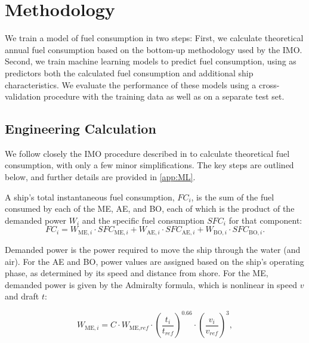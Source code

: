 \section{Methodology}\label{sec:MLmethodology}

We train a model of fuel consumption in two steps: First, we calculate theoretical annual fuel consumption based on the bottom-up methodology used by the \ac{IMO}. Second, we train machine learning models to predict fuel consumption, using as predictors both the calculated fuel consumption and additional ship characteristics. We evaluate the performance of these models using a cross-validation procedure with the training data as well as on a separate test set.

\subsection{Engineering Calculation}\label{subsec:engcalc}
We follow closely the \ac{IMO} procedure described in \textcite{faber2020fourth} to calculate theoretical fuel consumption, with only a few minor simplifications. The key steps are outlined below, and further details are provided in \autoref{app:ML}. 

A ship's total instantaneous fuel consumption, $FC_{i}$, is the sum of the fuel consumed by each of the \acf{ME}, \acf{AE}, and \acf{BO}, each of which is the product of the demanded power $W_{i}$ and the specific fuel consumption $SFC_{i}$ for that component:
\begin{equation*}
    FC_{i} = W_{\text{ME},i} \cdot SFC_{\text{ME},i} + W_{\text{AE},i} \cdot SFC_{\text{AE},i} + W_{\text{BO},i} \cdot SFC_{\text{BO},i}.
\end{equation*}

Demanded power is the power required to move the ship through the water (and air). For the \acl{AE} and \acl{BO}, power values are assigned based on the ship's operating phase, as determined by its speed and distance from shore. For the \acl{ME}, demanded power is given by the Admiralty formula, which is nonlinear in speed $v$ and draft $t$:

\begin{equation}\label{eqn:admiralty}
    W_{\text{ME},i} = C \cdot W_{\text{ME},\textit{ref}} \cdot \left( \frac{t_i}{t_{\textit{ref}}} \right)^{0.66} \cdot \left( \frac{v_i}{v_{\textit{ref}}} \right)^{3},
\end{equation}

